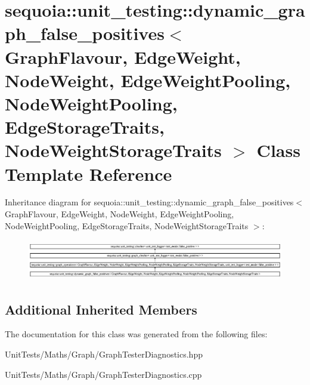 \hypertarget{classsequoia_1_1unit__testing_1_1dynamic__graph__false__positives}{}\section{sequoia\+::unit\+\_\+testing\+::dynamic\+\_\+graph\+\_\+false\+\_\+positives$<$ Graph\+Flavour, Edge\+Weight, Node\+Weight, Edge\+Weight\+Pooling, Node\+Weight\+Pooling, Edge\+Storage\+Traits, Node\+Weight\+Storage\+Traits $>$ Class Template Reference}
\label{classsequoia_1_1unit__testing_1_1dynamic__graph__false__positives}
Inheritance diagram for sequoia\+::unit\+\_\+testing\+::dynamic\+\_\+graph\+\_\+false\+\_\+positives$<$ Graph\+Flavour, Edge\+Weight, Node\+Weight, Edge\+Weight\+Pooling, Node\+Weight\+Pooling, Edge\+Storage\+Traits, Node\+Weight\+Storage\+Traits $>$\+:\begin{figure}[H]
\begin{center}
\leavevmode
\includegraphics[height=1.783440cm]{classsequoia_1_1unit__testing_1_1dynamic__graph__false__positives}
\end{center}
\end{figure}
\subsection*{Additional Inherited Members}


The documentation for this class was generated from the following files\+:\begin{DoxyCompactItemize}
\item 
Unit\+Tests/\+Maths/\+Graph/Graph\+Tester\+Diagnostics.\+hpp\item 
Unit\+Tests/\+Maths/\+Graph/Graph\+Tester\+Diagnostics.\+cpp\end{DoxyCompactItemize}
